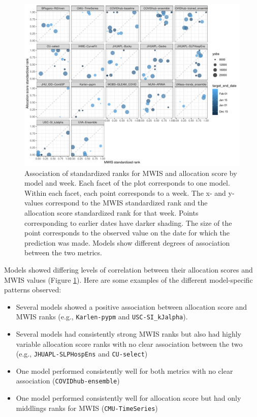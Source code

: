 \documentclass{article}\usepackage[]{graphicx}\usepackage[]{xcolor}
\makeatletter
\def\maxwidth{ %
  \ifdim\Gin@nat@width>\linewidth
    \linewidth
  \else
    \Gin@nat@width
  \fi
}
\newenvironment{knitrout}{}{} %
\makeatother
\begin{document}
\begin{knitrout}
\color{fgcolor}\begin{figure}
\includegraphics[width=\maxwidth]{figure/metrics-correlation-1} \caption[Association of standardized ranks for MWIS and allocation score by model and week]{Association of standardized ranks for MWIS and allocation score by model and week. Each facet of the plot corresponds to one model. Within each facet, each point corresponds to a week. The x- and y-values correspond to the MWIS standardized rank and the allocation score standardized rank for that week. Points corresponding to earlier dates have darker shading. The size of the point corresponds to the observed value on the date for which the prediction was made. Models show different degrees of association between the two metrics.}\label{fig:metrics-correlation}
\end{figure}

\end{knitrout}

Models showed differing levels of correlation between their allocation scores and MWIS values (Figure \ref{fig:metrics-correlation}).
Here are some examples of the different model-specific patterns observed:
\begin{itemize}
\item Several models showed a positive association between allocation score and MWIS ranks (e.g., \texttt{Karlen-pypm} and \texttt{USC-SI\_kJalpha}).
\item Several models had consistently strong MWIS ranks but also had highly variable allocation score ranks with no clear association between the two (e.g., \texttt{JHUAPL-SLPHospEns} and \texttt{CU-select})
\item One model performed consistently well for both metrics with no clear association (\texttt{COVIDhub-ensemble})
\item One model performed consistently well for allocation score but had only middlings ranks for MWIS (\texttt{CMU-TimeSeries})
\end{itemize}
\end{document}
